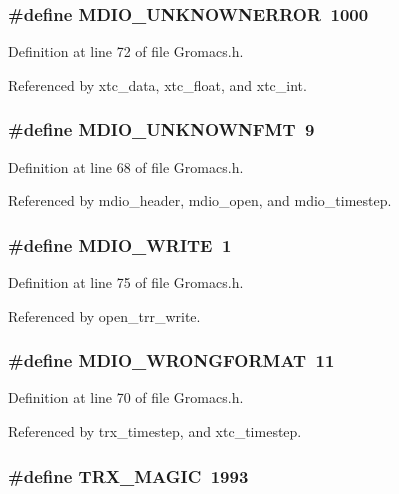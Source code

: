 \subsubsection{\setlength{\rightskip}{0pt plus 5cm}\#define MDIO\_\-UNKNOWNERROR\ 1000}\label{Gromacs_8h_a14}




Definition at line 72 of file Gromacs.h.

Referenced by xtc\_\-data, xtc\_\-float, and xtc\_\-int.
\subsubsection{\setlength{\rightskip}{0pt plus 5cm}\#define MDIO\_\-UNKNOWNFMT\ 9}\label{Gromacs_8h_a10}




Definition at line 68 of file Gromacs.h.

Referenced by mdio\_\-header, mdio\_\-open, and mdio\_\-timestep.
\subsubsection{\setlength{\rightskip}{0pt plus 5cm}\#define MDIO\_\-WRITE\ 1}\label{Gromacs_8h_a16}




Definition at line 75 of file Gromacs.h.

Referenced by open\_\-trr\_\-write.
\subsubsection{\setlength{\rightskip}{0pt plus 5cm}\#define MDIO\_\-WRONGFORMAT\ 11}\label{Gromacs_8h_a12}




Definition at line 70 of file Gromacs.h.

Referenced by trx\_\-timestep, and xtc\_\-timestep.
\subsubsection{\setlength{\rightskip}{0pt plus 5cm}\#define TRX\_\-MAGIC\ 1993}\label{Gromacs_8h_a18}




